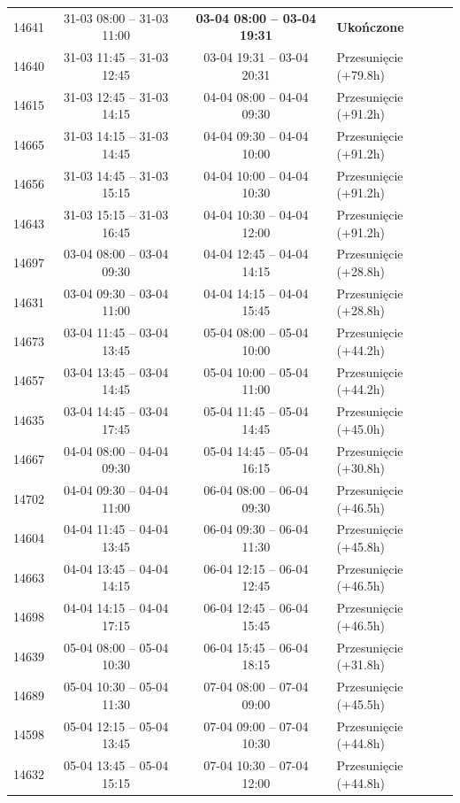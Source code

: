 \begin{table}[htbp]
\begin{tabular}{|r|c|c|l|}
14641 & 31-03 08:00 -- 31-03 11:00 & \textbf{03-04 08:00 -- 03-04 19:31} & \textbf{Ukończone} \\ 
14640 & 31-03 11:45 -- 31-03 12:45 & 03-04 19:31 -- 03-04 20:31 & Przesunięcie (+79.8h) \\ 
14615 & 31-03 12:45 -- 31-03 14:15 & 04-04 08:00 -- 04-04 09:30 & Przesunięcie (+91.2h) \\ 
14665 & 31-03 14:15 -- 31-03 14:45 & 04-04 09:30 -- 04-04 10:00 & Przesunięcie (+91.2h) \\ 
14656 & 31-03 14:45 -- 31-03 15:15 & 04-04 10:00 -- 04-04 10:30 & Przesunięcie (+91.2h) \\ 
14643 & 31-03 15:15 -- 31-03 16:45 & 04-04 10:30 -- 04-04 12:00 & Przesunięcie (+91.2h) \\ 
14697 & 03-04 08:00 -- 03-04 09:30 & 04-04 12:45 -- 04-04 14:15 & Przesunięcie (+28.8h) \\ 
14631 & 03-04 09:30 -- 03-04 11:00 & 04-04 14:15 -- 04-04 15:45 & Przesunięcie (+28.8h) \\ 
14673 & 03-04 11:45 -- 03-04 13:45 & 05-04 08:00 -- 05-04 10:00 & Przesunięcie (+44.2h) \\ 
14657 & 03-04 13:45 -- 03-04 14:45 & 05-04 10:00 -- 05-04 11:00 & Przesunięcie (+44.2h) \\ 
14635 & 03-04 14:45 -- 03-04 17:45 & 05-04 11:45 -- 05-04 14:45 & Przesunięcie (+45.0h) \\ 
14667 & 04-04 08:00 -- 04-04 09:30 & 05-04 14:45 -- 05-04 16:15 & Przesunięcie (+30.8h) \\ 
14702 & 04-04 09:30 -- 04-04 11:00 & 06-04 08:00 -- 06-04 09:30 & Przesunięcie (+46.5h) \\ 
14604 & 04-04 11:45 -- 04-04 13:45 & 06-04 09:30 -- 06-04 11:30 & Przesunięcie (+45.8h) \\ 
14663 & 04-04 13:45 -- 04-04 14:15 & 06-04 12:15 -- 06-04 12:45 & Przesunięcie (+46.5h) \\ 
14698 & 04-04 14:15 -- 04-04 17:15 & 06-04 12:45 -- 06-04 15:45 & Przesunięcie (+46.5h) \\ 
14639 & 05-04 08:00 -- 05-04 10:30 & 06-04 15:45 -- 06-04 18:15 & Przesunięcie (+31.8h) \\ 
14689 & 05-04 10:30 -- 05-04 11:30 & 07-04 08:00 -- 07-04 09:00 & Przesunięcie (+45.5h) \\ 
14598 & 05-04 12:15 -- 05-04 13:45 & 07-04 09:00 -- 07-04 10:30 & Przesunięcie (+44.8h) \\ 
14632 & 05-04 13:45 -- 05-04 15:15 & 07-04 10:30 -- 07-04 12:00 & Przesunięcie (+44.8h) \\ 

\end{tabular}
\end{table}
